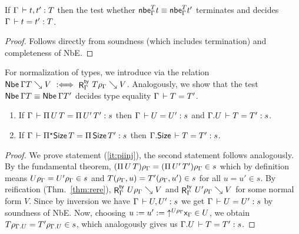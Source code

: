 \documentclass[acmlarge,review,anonymous]{acmart}\settopmatter{printfolios=true}
\begin{document}
\begin{corollary}
  If\/ $\Gamma \,\vdash t,t' : T$ then the test whether $\mathsf{nbe}_{\Gamma}^{T} t \equiv \mathsf{nbe}_{\Gamma}^{T}{t'}$
  terminates and
  decides $\Gamma \,\vdash t = t' : T$.
\end{corollary}
\begin{proof}
  Follows directly from soundness (which includes termination) and completeness of NbE.
\end{proof}

For normalization of types, we introduce 
via the relation $\mathop{\mathsf{Nbe}}\nolimits_{} \Gamma T \searrow V \mathrel{\ :\Longleftrightarrow\ } \mathop{\mathsf{R}}\nolimits^{\mathsf{ty}}_{\Gamma} \, T\rho_\Gamma \searrow V$.
Analogously, we show that the test $\mathop{\mathsf{Nbe}}\nolimits_{} \Gamma T \equiv \mathop{\mathsf{Nbe}}\nolimits_{} \Gamma T'$
decides type equality $\Gamma \,\vdash T = T'$.

\begin{corollary}
  \label{cor:piinj}
  \bla
  \begin{enumerate}
  \item \label{it:piinj}
    If $\Gamma \,\vdash \Pi\,U\, T = \Pi\,U'\,{T'} : s$ then
    $\Gamma \,\vdash U = U' : s$ and
    $\Gamma. U \,\vdash T = T' : s$.
  \item \label{it:allinj}
    If $\Gamma \,\vdash \Pi{}^{\mathord{\star}}\mathsf{Size}\, T = \Pi\,\mathsf{Size}\,{T'} : s$ then
    $\Gamma. \mathsf{Size} \,\vdash T = T' : s$.
  \end{enumerate}
\end{corollary}
\begin{proof}\bla
We prove statement (\ref{it:piinj}), the second statement follows analogously.
By the fundamental theorem,
$(\Pi\,U\, T)\rho_\Gamma = (\Pi\,U'\,{T'})\rho_\Gamma \in s$ which by definition means
$U\rho_\Gamma = U'\rho_\Gamma \in s$ and $T(\rho_\Gamma,u) = T'(\rho_\Gamma,u') \in s$ for all $u = u' \in s$.
By reification (Thm.~\ref{thm:rere}),
$\mathop{\mathsf{R}}\nolimits^{\mathsf{ty}}_{\Gamma} \, U\rho_\Gamma \searrow V$ and $\mathop{\mathsf{R}}\nolimits^{\mathsf{ty}}_{\Gamma} \, U'\rho_\Gamma \searrow V$ for some normal form
$V$.
Since by inversion we have $\Gamma \,\vdash U,U' : s$ we get $\Gamma \,\vdash U = U' : s$ by soundness of NbE.
Now, choosing $u := u' := \mathord{\uparrow^{U\rho_\Gamma}} \mathsf{x}_{\Gamma} \in U$, we obtain
$T\rho_{\Gamma. U} = T' \rho_{\Gamma. U} \in s$, which analogously gives us $\Gamma. U \,\vdash T = T' : s$.
\end{proof}





\begin{lemma}

\end{lemma}
\end{document}
